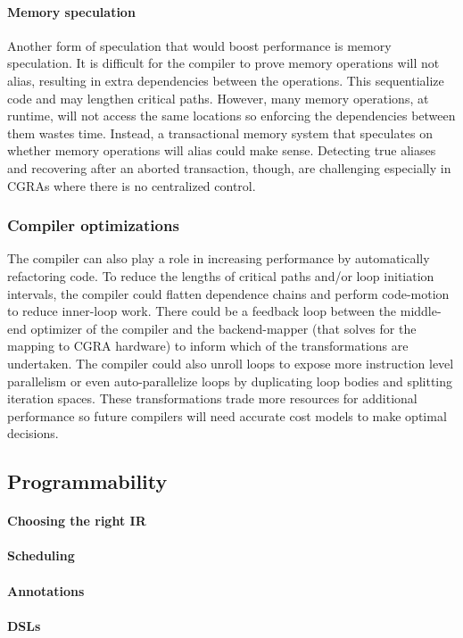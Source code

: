 \paragraph{Memory speculation}
Another form of speculation that would boost performance is memory speculation.
% 
% 
It is difficult for the compiler to prove memory operations will not alias, resulting in extra dependencies between the operations.
% 
This sequentialize code and may lengthen critical paths.
% 
However, many memory operations, at runtime, will not access the same locations so enforcing the dependencies between them wastes time.
% 
Instead, a transactional memory system that speculates on whether memory operations will alias could make sense.
% 
Detecting true aliases and recovering after an aborted transaction, though, are challenging especially in CGRAs where there is no centralized control.

\subsubsection{Compiler optimizations}
The compiler can also play a role in increasing performance by automatically refactoring code.
%
To reduce the lengths of critical paths and/or loop initiation intervals, the compiler could flatten dependence chains and perform code-motion to reduce inner-loop work.
% 
There could be a feedback loop between the middle-end optimizer of the compiler and the backend-mapper (that solves for the mapping to CGRA hardware) to inform which of the transformations are undertaken.
% 
The compiler could also unroll loops to expose more instruction level parallelism or even auto-parallelize loops by duplicating loop bodies and splitting iteration spaces.
% 
These transformations trade more resources for additional performance so future compilers will need accurate cost models to make optimal decisions.

\subsection{Programmability}
\paragraph{Choosing the right IR}
\paragraph{Scheduling}
\paragraph{Annotations}
\paragraph{DSLs}